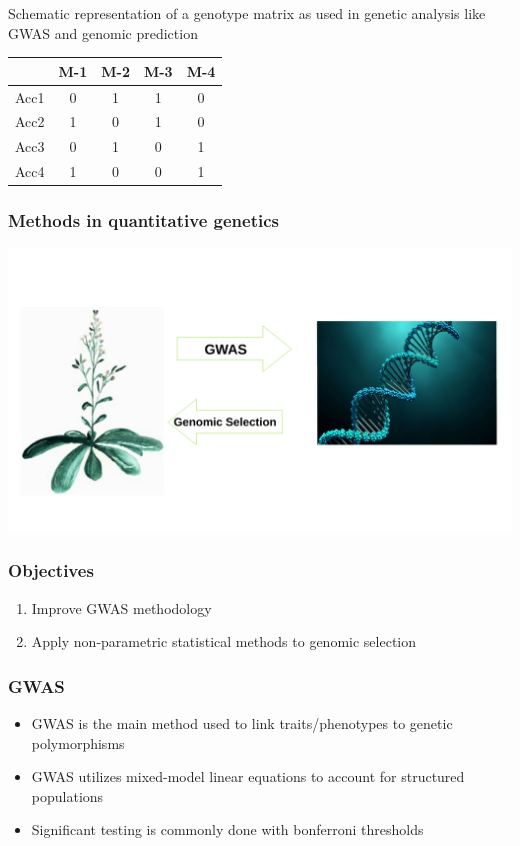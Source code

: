 \documentclass{beamer}
\begin{document}
\begin{frame}
  Schematic representation of a genotype matrix as used in genetic analysis like GWAS and genomic prediction \\
\begin{table}[H]
 \centering
 \begin{tabular}{l|cccc} 
   \hline
        & M-1 & M-2 & M-3 & M-4 \\
   \hline
   Acc1 & 0   & 1   & 1   & 0   \\
   Acc2 & 1   & 0   & 1   & 0   \\
   Acc3 & 0   & 1   & 0   & 1   \\
   Acc4 & 1   & 0   & 0   & 1   \\
   \hline
 \end{tabular}
\end{table}
\end{frame}


\begin{frame}
  \frametitle{Methods in quantitative genetics}
  \includegraphics[height=.8\textheight,width=.9\textwidth]{bla.pdf}
\end{frame}

\begin{frame}
  \frametitle{Objectives}
  \begin{enumerate} [<+->]
  \item Improve GWAS methodology 
  \item Apply non-parametric statistical methods to genomic selection
  \end{enumerate}
\end{frame}

\begin{frame}
  \frametitle{GWAS}
  \begin{itemize}[<+->]
  \item GWAS is the main method used to link traits/phenotypes to genetic polymorphisms
  \item GWAS utilizes mixed-model linear equations to account for structured populations
  \item Significant testing is commonly done with bonferroni thresholds 
  \end{itemize}
\end{frame}
\end{document}

